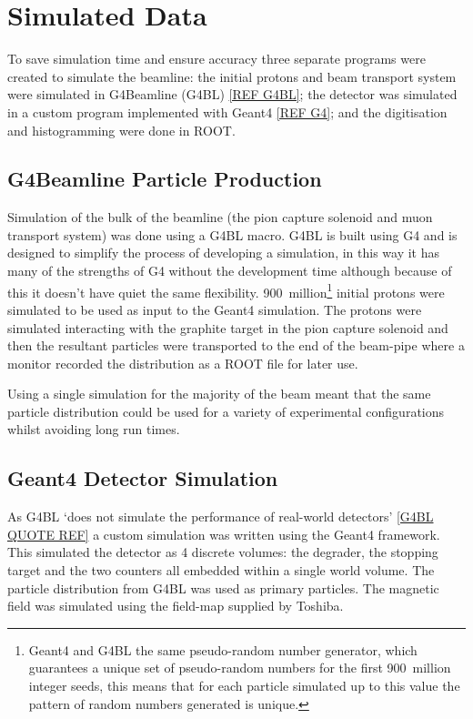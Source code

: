 \documentclass[]{article}
\begin{document}
\section{Simulated Data} %
\label{sec:simulated_data}
To save simulation time and ensure accuracy three separate programs were created to simulate the beamline: the initial protons and beam transport system were simulated in G4Beamline (G4BL) \ref{REF G4BL}; the detector was simulated in a custom program implemented with Geant4 \ref{REF G4}; and the digitisation and histogramming were done in ROOT.

\subsection{G4Beamline Particle Production} %
\label{sub:g4bl_particle_production}
Simulation of the bulk of the beamline (the pion capture solenoid and muon transport system) was done using a G4BL macro. G4BL is built using G4 and is designed to simplify the process of developing a simulation, in this way it has many of the strengths of G4 without the development time although because of this it doesn't have quiet the same flexibility. 900~million\footnote{ Geant4 and G4BL the same pseudo-random number generator, which guarantees a unique set of pseudo-random numbers for the first 900~million integer seeds, this means that for each particle simulated up to this value the pattern of random numbers generated is unique.} initial protons were simulated to be used as input to the Geant4 simulation. The protons were simulated interacting with the graphite target in the pion capture solenoid and then the resultant particles were transported to the end of the beam-pipe where a monitor recorded the distribution as a ROOT file for later use. 

Using a single simulation for the majority of the beam meant that the same particle distribution could be used for a variety of experimental configurations whilst avoiding long run times.

\subsection{Geant4 Detector Simulation} %
\label{sub:geant4_detector_simulation}
As G4BL `does not simulate the performance of real-world detectors' \ref{G4BL QUOTE REF} a custom simulation was written using the Geant4 framework. This simulated the detector as 4 discrete volumes: the degrader, the stopping target and the two counters all embedded within a single world volume. The particle distribution from G4BL was used as primary particles. The magnetic field was simulated using the field-map supplied by Toshiba.
\end{document}
